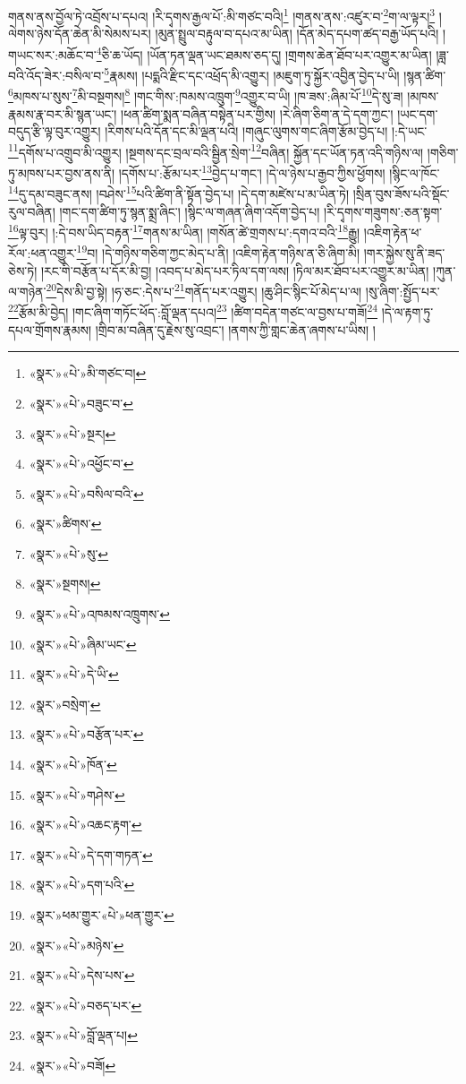 གནས་ནས་བྱོལ་ཏེ་འབྲོས་པ་དཔའ། །རི་དྭགས་རྒྱལ་པོ་:མི་གཙང་བའི།\footnote{«སྣར་»«པེ་»མི་གཙང་བ།} །གནས་ནས་:འཛུར་བ་\footnote{«སྣར་»«པེ་»བཟུང་བ་}ག་ལ་ལྟར།\footnote{«སྣར་»«པེ་»སྔར།} །ལེགས་ཉེས་དོན་ཆེན་མི་སེམས་པར། །མུན་སྤྲུལ་བརྟུལ་བ་དཔའ་མ་ཡིན། །དོན་མེད་དཔག་ཚད་བརྒྱ་ཡོད་པའི། །གཡང་སར་:མཆོང་བ་\footnote{«སྣར་»«པེ་»འཕྱོང་བ་}ཅི་ཆ་ཡོད། །ཡོན་ཏན་ལྡན་ཡང་ཐམས་ཅད་དུ། །གྲགས་ཆེན་ཐོབ་པར་འགྱུར་མ་ཡིན། །ཟླ་བའི་འོད་ཟེར་:བསིལ་བ་\footnote{«སྣར་»«པེ་»བསིལ་བའི་}རྣམས། །པདྨའི་རྫིང་དང་འཕྲོད་མི་འགྱུར། །མཇུག་ཏུ་སྐྱོར་འབྱིན་བྱེད་པ་ཡི། །སྙན་ཚིག་\footnote{«སྣར་»ཚིགས་}མཁས་པ་སུས་\footnote{«སྣར་»«པེ་»སུ་}མི་བསྔགས།\footnote{«སྣར་»སྔགས།} །གང་གིས་:ཁམས་འཁྲུག་\footnote{«སྣར་»«པེ་»འཁམས་འཁྲུགས་}འགྱུར་བ་ཡི། །ཁ་ཟས་:ཞིམ་པོ་\footnote{«སྣར་»«པེ་»ཞིམ་ཡང་}དེ་སུ་ཟ། །མཁས་རྣམས་རྣ་བར་མི་སྙན་ཡང་། །ཕན་ཚིག་སྨན་བཞིན་བསྟེན་པར་གྱིས། །རེ་ཞིག་ཅིག་ན་དེ་དག་ཀྱང་། །ཡང་དག་བདུད་རྩི་ལྟ་བུར་འགྱུར། །རིགས་པའི་དོན་དང་མི་ལྡན་པའི། །གཞུང་ལུགས་གང་ཞིག་རྩོམ་བྱེད་པ། །:དེ་ཡང་\footnote{«སྣར་»«པེ་»དེ་ཡི་}དགོས་པ་འགྲུབ་མི་འགྱུར། །སྔགས་དང་བྲལ་བའི་སྦྱིན་སྲེག་\footnote{«སྣར་»བསྲེག་}བཞིན། སྐྱོན་དང་ཡོན་ཏན་འདི་གཉིས་ལ། །གཅིག་ཏུ་མཁས་པར་བྱས་ནས་ནི། །དགོས་པ་:རྩོམ་པར་\footnote{«སྣར་»«པེ་»བརྩོན་པར་}བྱེད་པ་གང་། །དེ་ལ་ཉེས་པ་རྒྱབ་ཀྱིས་ཕྱོགས། །སྙིང་ལ་ཁོང་\footnote{«སྣར་»«པེ་»ཁོན་}དུ་དམ་བཟུང་ནས། །བཤེས་\footnote{«སྣར་»«པེ་»གཤེས་}པའི་ཚིག་ནི་སྟོན་བྱེད་པ། །དེ་དག་མཛེས་པ་མ་ཡིན་ཏེ། །སྲིན་བུས་ཟོས་པའི་སྡོང་རུལ་བཞིན། །གང་དག་ཚིག་ཏུ་སྙན་སྨྲ་ཞིང་། །སྙིང་ལ་གཞན་ཞིག་འདོག་བྱེད་པ། །རི་དྭགས་གཟུགས་:ཅན་སྟག་\footnote{«སྣར་»«པེ་»འཆང་རྟག་}ལྟ་བུར། །:དེ་བས་ཡིད་བརྟན་\footnote{«སྣར་»«པེ་»དེ་དག་གཏན་}གནས་མ་ཡིན། །གསོན་ཚེ་གྲགས་པ་:དགའ་བའི་\footnote{«སྣར་»«པེ་»དག་པའི་}རྒྱུ། །འཇིག་རྟེན་ཕ་རོལ་:ཕན་འགྱུར་\footnote{«སྣར་»ཕམ་གྱུར་«པེ་»ཕན་གྱུར་}བ། །དེ་གཉིས་གཅིག་ཀྱང་མེད་པ་ནི། །འཇིག་རྟེན་གཉིས་ན་ཅི་ཞིག་མི། །གར་སྐྱེས་སུ་ནི་ཟད་ཅེས་ཏེ། །རང་གི་བརྩོན་པ་དོར་མི་བྱ། །འབད་པ་མེད་པར་ཏིལ་དག་ལས། །ཏིལ་མར་ཐོབ་པར་འགྱུར་མ་ཡིན། །ཀུན་ལ་གཉེན་\footnote{«སྣར་»«པེ་»མཉེས་}དེས་མི་བྱ་སྟེ། །ཧ་ཅང་:དེས་པ་\footnote{«སྣར་»«པེ་»དེས་པས་}གནོད་པར་འགྱུར། །ཆུ་ཤིང་སྙིང་པོ་མེད་པ་ལ། །སུ་ཞིག་:སྤྱོད་པར་\footnote{«སྣར་»«པེ་»བཅད་པར་}རྩོམ་མི་བྱེད། །གང་ཞིག་གཏོང་ཕོད་:བློ་ལྡན་དཔའ།\footnote{«སྣར་»«པེ་»བློ་ལྡན་པ།} །ཚིག་བདེན་གཙང་ལ་བྱས་པ་གཟོ།\footnote{«སྣར་»«པེ་»བཟོ།} །དེ་ལ་རྟག་ཏུ་དཔལ་གྲོགས་རྣམས། །གྲིབ་མ་བཞིན་དུ་རྗེས་སུ་འབྲང་། །ནགས་ཀྱི་གླང་ཆེན་ཞགས་པ་ཡིས། །
